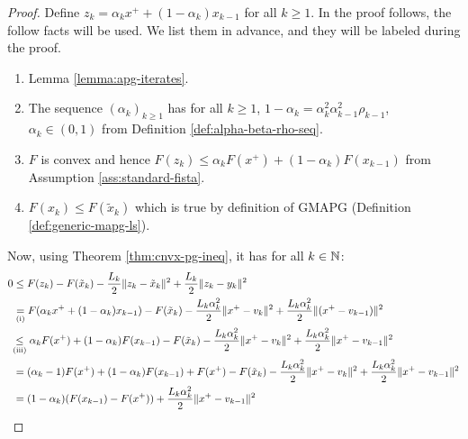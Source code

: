 \documentclass[12pt]{report}
\begin{document}
        \begin{proof}
            Define $z_k = \alpha_k x^+ + (1 - \alpha_k)x_{k - 1}$ for all $k \ge 1$. 
            In the proof follows, the follow facts will be used. 
            We list them in advance, and they will be labeled during the proof. 
            \begin{enumerate}
                \item Lemma \ref{lemma:apg-iterates}. 
                \item The sequence $(\alpha_k)_{k \ge 1}$ has for all $k \ge 1$, $1 - \alpha_k = \alpha_k^2\alpha_{k - 1}^2\rho_{k - 1}$, $\alpha_k \in (0, 1)$ from Definition \ref{def:alpha-beta-rho-seq}. 
                \item $F$ is convex and hence $F(z_k) \le \alpha_k F(x^+) + (1 - \alpha_k)F(x_{k - 1})$ from Assumption \ref{ass:standard-fista}. 
                \item $F(x_k) \le F(\tilde x_k)$ which is true by definition of GMAPG (Definition \ref{def:generic-mapg-ls}). 
            \end{enumerate}
            Now, using Theorem \ref{thm:cnvx-pg-ineq}, it has for all $k \in \mathbb N$: 
            {\allowdisplaybreaks\small
            \begin{align*}
                0 &\le 
                F(z_k) 
                - F(\tilde x_k) - \frac{L_k}{2}\Vert z_k - \tilde x_k\Vert^2 + 
                \frac{L_k}{2}\Vert z_k - y_k\Vert^2
                \\
                &\underset{\text{(i)}}{=}
                F(\alpha_k x^+ + (1 - \alpha_k)x_{k - 1}) - F(\tilde x_k)
                - \frac{L_k\alpha_k^2}{2}\Vert x^+ - v_k \Vert^2 
                + \frac{L_k\alpha_k^2}{2}\Vert(x^+ - v_{k - 1})\Vert^2
                \\
                &\hspace{-0.3em}\underset{\text{(iii)}}{\le} 
                \alpha_k F(x^+) + (1 - \alpha_k) F(x_{k - 1}) - F(\tilde x_k)
                - \frac{L_k\alpha_k^2}{2}\Vert x^+ - v_k \Vert^2 
                + \frac{L_k\alpha_k^2}{2}\Vert x^+ - v_{k - 1} \Vert^2
                \\
                &= 
                (\alpha_k - 1)F(x^+) + (1 - \alpha_k) F(x_{k - 1}) + F(x^+) - F(\tilde x_k)
                - \frac{L_k\alpha_k^2}{2}\Vert x^+ - v_k \Vert^2 
                + \frac{L_k\alpha_k^2}{2}\Vert x^+ - v_{k - 1}\Vert^2
                \\
                &= 
                (1 - \alpha_k)(F(x_{k - 1}) - F(x^+)) + \frac{L_k\alpha_k^2}{2}\Vert x^+ - v_{k - 1}\Vert^2

\end{align*}}
\end{proof}
\end{document}
